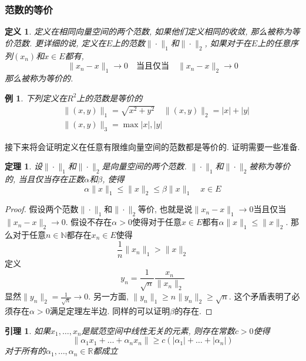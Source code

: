 \documentclass[a4paper,11pt]{article}
\newtheorem{definition}{\hspace{2em}定义}[section]
\newtheorem{theorem}{\hspace{2em}定理}[section]
\newtheorem{lemma}{\hspace{2em}引理}[section]
\newtheorem{proof}{证明}[section]
\newtheorem{example}{例}[section]
\begin{document}
\subsubsection*{范数的等价}
\begin{definition}
  定义在相同向量空间的两个范数, 如果他们定义相同的收敛, 那么被称为等价范数. 更详细的说, 定义在$E$上的范数$\|\cdot\|_1$和$\|\cdot\|_2$, 如果对于在$E$上的任意序列$(x_n)$和$x\in E$都有,
  \begin{equation*}
    \|x_n-x\|_1\to 0 \quad \text{当且仅当}\quad \|x_n-x\|_2\to 0
  \end{equation*}
  那么被称为等价的.
\end{definition}
\begin{example}
  下列定义在$R^2$上的范数是等价的
  \begin{equation*}
  \begin{split}
       &\|(x,y)\|_1=\sqrt{x^2+y^2}\quad \|(x,y)\|_2=|x|+|y| \\
       &\|(x,y)\|_3=\max{|x|,|y|}
  \end{split}
  \end{equation*}
\end{example}
接下来将会证明定义在任意有限维向量空间的范数都是等价的. 证明需要一些准备.
\begin{theorem}\label{norm equivalence}
  设$\|\cdot\|_1$和$\|\cdot\|_2$是向量空间的两个范数. $\|\cdot\|_1$和$\|\cdot\|_2$被称为等价的, 当且仅当存在正数$\alpha$和$\beta$, 使得
  \begin{equation*}
    \alpha\|x\|_1\leq\|x\|_2\leq\beta\|x\|_1\quad x\in E
  \end{equation*}
\end{theorem}
\begin{proof}
  假设两个范数$\|\cdot\|_1$和$\|\cdot\|_2$等价, 也就是说$\|x_n-x\|_1\to 0$当且仅当$\|x_n-x\|_2\to 0$. 假设不存在$\alpha>0$使得对于任意$x\in E$都有$\alpha\|x\|_1\leq\|x\|_2$. 那么对于任意$n\in \mathbb{N}$都存在$x_n\in E$使得
  \begin{equation*}
    \frac{1}{n}\|x_n\|_1>\|x\|_2
  \end{equation*}
  定义
  \begin{equation*}
    y_n=\frac{1}{\sqrt{n}}\frac{x_n}{\|x_n\|_2}
  \end{equation*}
  显然$\|y_n\|_2=\frac{1}{\sqrt{n}}\to 0$. 另一方面, $\|y_n\|_1\geq n\|y_n\|_2\geq \sqrt{n}$. 这个矛盾表明了必须存在$\alpha>0$满足定理左半边. 同样的可以证明$\beta$的存在.
\end{proof}
\begin{lemma}\label{norm Lemma}
  如果$x_1,\dots,x_n$是赋范空间中线性无关的元素, 则存在常数$c>0$使得
  \begin{equation}\label{norm lemma}
    \|\alpha_1x_1+\dots+\alpha_nx_n\|\geq c(|\alpha_1|+\dots+|\alpha_n|)
  \end{equation}
  对于所有的$\alpha_1,\dots,\alpha_n\in\mathbb{R}$都成立
\end{lemma}
\end{document}
